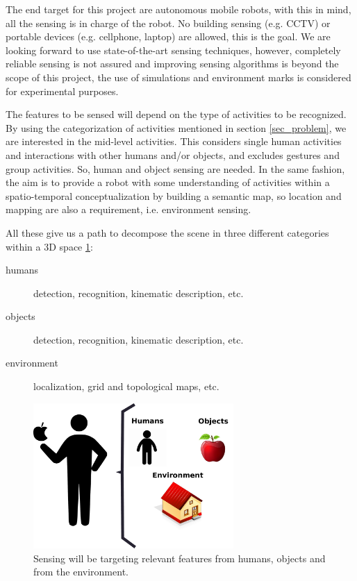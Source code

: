 The end target for this project are autonomous mobile robots, with this in mind, all the sensing is in charge of the robot. 
No building sensing (e.g. CCTV) or portable devices (e.g. cellphone, laptop) are allowed, this is the goal.
We are looking forward to use state-of-the-art sensing techniques, however, completely reliable sensing is not assured and improving sensing algorithms is beyond the scope of this project, the use of simulations and environment marks is considered for experimental purposes. 

The features to be sensed will depend on the type of activities to be recognized.
By using the categorization of activities mentioned in section \ref{sec_problem}, we are interested in the mid-level activities.
This considers single human activities and interactions with other humans and/or objects, and excludes gestures and group activities.
So, human and object sensing are needed.
In the same fashion, the aim is to provide a robot with some understanding of activities within a spatio-temporal conceptualization by building a semantic map, so location and mapping are also a requirement, i.e. environment sensing.

All these give us a path to decompose the scene in three different categories within a 3D space \ref{fig:decomposition}: 
\begin{description}
\item[humans] detection, recognition, kinematic description, etc.
\item[objects] detection, recognition, kinematic description, etc.
\item[environment] localization, grid and topological maps, etc.
\end{description}

\begin{figure}[h]
\centering
\includegraphics[width=3in]{fig/scene_dec.pdf}
\caption{Sensing will be targeting relevant features from humans, objects and from the environment.}
\label{fig:decomposition}
\end{figure}

